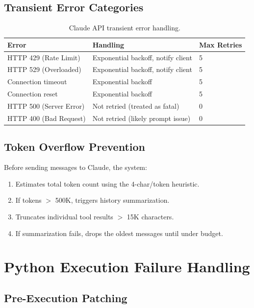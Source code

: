 \subsection{Transient Error Categories}

\begin{table}[H]
\centering
\caption{Claude API transient error handling.}
\label{tab:claude-errors}
\begin{tabularx}{\textwidth}{lXl}
\toprule
\textbf{Error} & \textbf{Handling} & \textbf{Max Retries} \\
\midrule
HTTP 429 (Rate Limit) & Exponential backoff, notify client & 5 \\
HTTP 529 (Overloaded) & Exponential backoff, notify client & 5 \\
Connection timeout & Exponential backoff & 5 \\
Connection reset & Exponential backoff & 5 \\
HTTP 500 (Server Error) & Not retried (treated as fatal) & 0 \\
HTTP 400 (Bad Request) & Not retried (likely prompt issue) & 0 \\
\bottomrule
\end{tabularx}
\end{table}

\subsection{Token Overflow Prevention}

Before sending messages to Claude, the system:

\begin{enumerate}
  \item Estimates total token count using the 4-char/token heuristic.
  \item If tokens $>$ 500K, triggers history summarization.
  \item Truncates individual tool results $>$ 15K characters.
  \item If summarization fails, drops the oldest messages until under budget.
\end{enumerate}

\section{Python Execution Failure Handling}
\label{sec:failure:python}

\subsection{Pre-Execution Patching}

